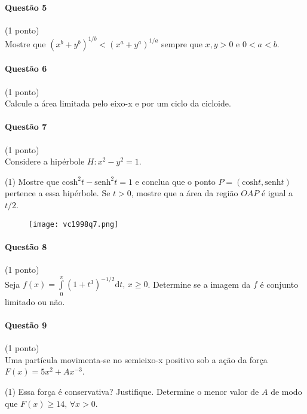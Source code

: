 \documentclass[12pt,a4paper]{article}
\newcommand{\dd}{\mathrm{d}}
\begin{document}
\paragraph{Questão 5} (1 ponto)\\
Mostre que $(x^b+y^b)^{1/b} < (x^a+y^a)^{1/a}$ sempre que $x,y>0$ e $0<a<b$.

\paragraph{Questão 6} (1 ponto)\\
Calcule a área limitada pelo eixo-x e por um ciclo da cicloide.

\paragraph{Questão 7} (1 ponto)\\
Considere a hipérbole $H: x^2-y^2 = 1$.

\begin{tasks}(1)
\task Mostre que $\mathrm{cosh}^2t - \mathrm{senh}^2t = 1$ e conclua que o ponto $P = (\mathrm{cosh}t, \mathrm{senh}t)$ pertence a essa hipérbole.
\task Se $t>0$, mostre que a área da região $OAP$ é igual a $t/2$.
\end{tasks}

\begin{figure}[ht]
\centering
\texttt{[image: vc1998q7.png]}
\end{figure}

\paragraph{Questão 8} (1 ponto)\\
Seja $f(x) = \displaystyle\int\limits_0^{\pi} (1+t^3)^{-1/2} \dd t,\, x\ge 0$. Determine se a imagem da $f$ é conjunto limitado ou não.

\paragraph{Questão 9} (1 ponto)\\
Uma partícula movimenta-se no semieixo-x positivo sob a ação da força $F(x) = 5x^2 + Ax^{-3}$.
\begin{tasks}(1)
\task Essa força é conservativa? Justifique.
\task Determine o menor valor de $A$ de modo que $F(x) \ge 14,\, \forall x >0$.
\end{tasks}
\end{document}

